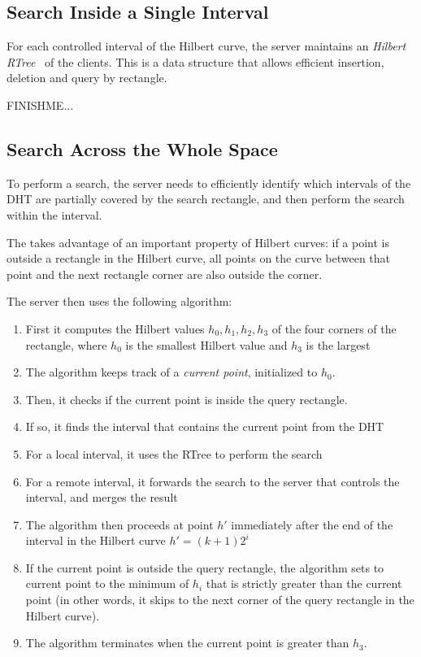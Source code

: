 \subsection{Search Inside a Single Interval}
For each controlled interval of the Hilbert curve, the server maintains an \textit{Hilbert RTree}~\cite{} of the clients.
This is a data structure that allows efficient insertion, deletion and query by rectangle.

FINISHME...

\subsection{Search Across the Whole Space}
To perform a search, the server needs to efficiently identify which intervals of the DHT are partially covered by the search rectangle, and then perform the search within the interval.

The takes advantage of an important property of Hilbert curves: if a point is outside a rectangle in the Hilbert curve, all points on the curve between that point and the next rectangle corner are also outside the corner.

The server then uses the following algorithm:
\begin{enumerate}
\item First it computes the Hilbert values $h_0, h_1, h_2, h_3$ of the four corners of the rectangle, where $h_0$ is the smallest Hilbert value and $h_3$ is the largest
\item The algorithm keeps track of a \textit{current point}, initialized to $h_0$.
\item Then, it checks if the current point is inside the query rectangle.
\item If so, it finds the interval that contains the current point from the DHT
\item For a local interval, it uses the RTree to perform the search
\item For a remote interval, it forwards the search to the server that controls the interval, and merges the result
\item The algorithm then proceeds at point $h'$ immediately after the end of the interval in the Hilbert curve $h' = (k+1) 2^i$
\item If the current point is outside the query rectangle, the algorithm sets to current point to the minimum of $h_i$ that is strictly greater than the current point (in other words, it skips to the next corner of the query rectangle in the Hilbert curve).
\item The algorithm terminates when the current point is greater than $h_3$.
\end{enumerate}

